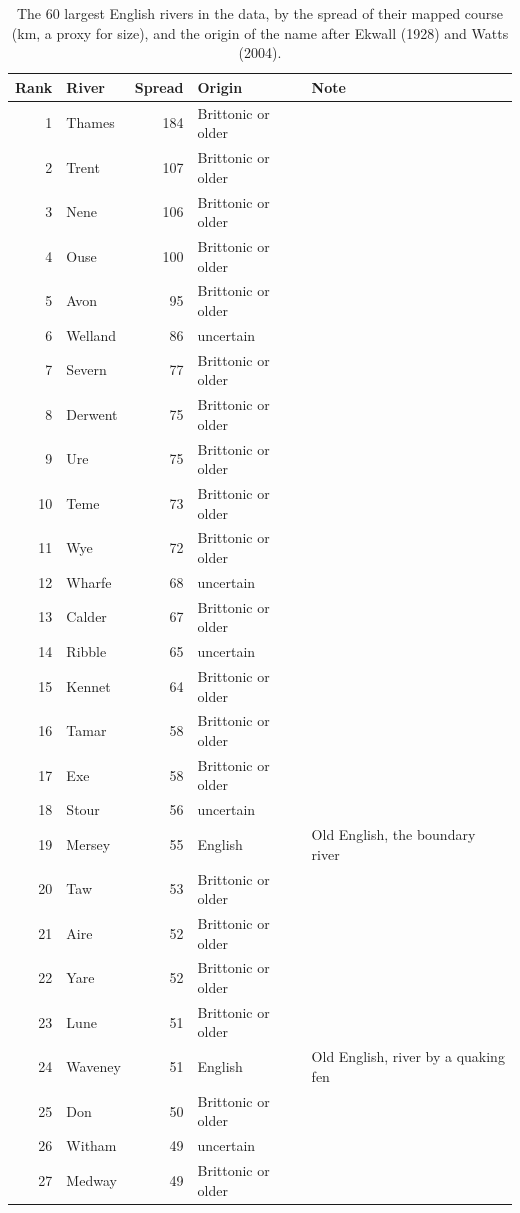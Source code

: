 \documentclass[11pt,a4paper]{article}
\begin{document}
\begin{small}\begin{longtable}{rlrlp{6.6cm}}\caption{The 60 largest English rivers in the data, by the spread of their mapped course (km, a proxy for size), and the origin of the name after Ekwall (1928) and Watts (2004).}\label{tab:major}\\\toprule Rank & River & Spread & Origin & Note\\\midrule\endhead
1 & Thames & 184 & Brittonic or older & \\
2 & Trent & 107 & Brittonic or older & \\
3 & Nene & 106 & Brittonic or older & \\
4 & Ouse & 100 & Brittonic or older & \\
5 & Avon & 95 & Brittonic or older & \\
6 & Welland & 86 & uncertain & \\
7 & Severn & 77 & Brittonic or older & \\
8 & Derwent & 75 & Brittonic or older & \\
9 & Ure & 75 & Brittonic or older & \\
10 & Teme & 73 & Brittonic or older & \\
11 & Wye & 72 & Brittonic or older & \\
12 & Wharfe & 68 & uncertain & \\
13 & Calder & 67 & Brittonic or older & \\
14 & Ribble & 65 & uncertain & \\
15 & Kennet & 64 & Brittonic or older & \\
16 & Tamar & 58 & Brittonic or older & \\
17 & Exe & 58 & Brittonic or older & \\
18 & Stour & 56 & uncertain & \\
19 & Mersey & 55 & English & Old English, the boundary river\\
20 & Taw & 53 & Brittonic or older & \\
21 & Aire & 52 & Brittonic or older & \\
22 & Yare & 52 & Brittonic or older & \\
23 & Lune & 51 & Brittonic or older & \\
24 & Waveney & 51 & English & Old English, river by a quaking fen\\
25 & Don & 50 & Brittonic or older & \\
26 & Witham & 49 & uncertain & \\
27 & Medway & 49 & Brittonic or older & \\

\end{longtable}
\end{small}
\end{document}

